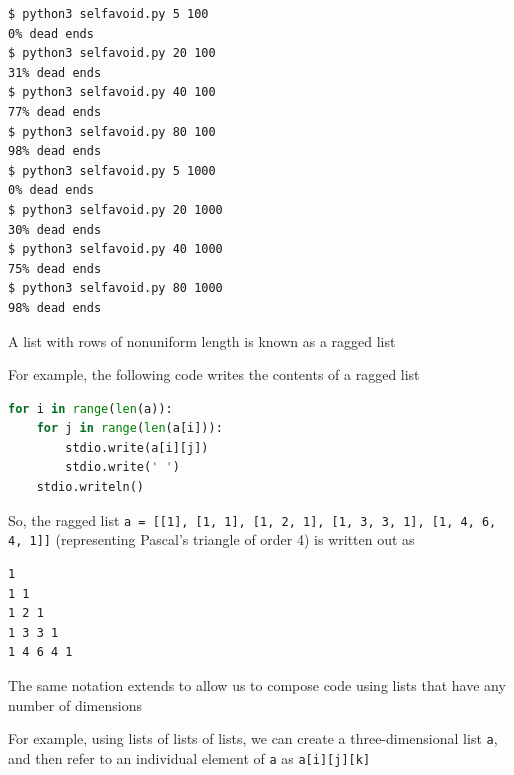 \documentclass[8pt,a4paper,compress]{beamer}
\begin{document}
\begin{frame}[fragile]
\begin{minipage}{110pt}
\end{minipage}
\end{frame}

\begin{frame}[fragile]
\pause

\begin{lstlisting}[language={}]
$ python3 selfavoid.py 5 100
0% dead ends
$ python3 selfavoid.py 20 100
31% dead ends
$ python3 selfavoid.py 40 100
77% dead ends
$ python3 selfavoid.py 80 100
98% dead ends
$ python3 selfavoid.py 5 1000
0% dead ends
$ python3 selfavoid.py 20 1000
30% dead ends
$ python3 selfavoid.py 40 1000
75% dead ends
$ python3 selfavoid.py 80 1000
98% dead ends
\end{lstlisting}
\end{frame}

\begin{frame}[fragile]
\pause

A list with rows of nonuniform length is known as a ragged list

\pause
\bigskip

For example, the following code writes the contents of a ragged list

\begin{lstlisting}[language=Python]
for i in range(len(a)):
    for j in range(len(a[i])):
        stdio.write(a[i][j])
        stdio.write(' ')
    stdio.writeln()
\end{lstlisting}

So, the ragged list \lstinline{a = [[1], [1, 1], [1, 2, 1], [1, 3, 3, 1], [1, 4, 6, 4, 1]]} (representing Pascal's triangle of order 4) is written out as

\begin{lstlisting}[language={}]
1
1 1
1 2 1
1 3 3 1
1 4 6 4 1
\end{lstlisting}

\pause
\bigskip

The same notation extends to allow us to compose code using lists that have any number of dimensions

\pause
\bigskip

For example, using lists of lists of lists, we can create a three-dimensional list \lstinline{a}, and then refer to an individual element of \lstinline{a} as \lstinline{a[i][j][k]}
\end{frame}
\end{document}
